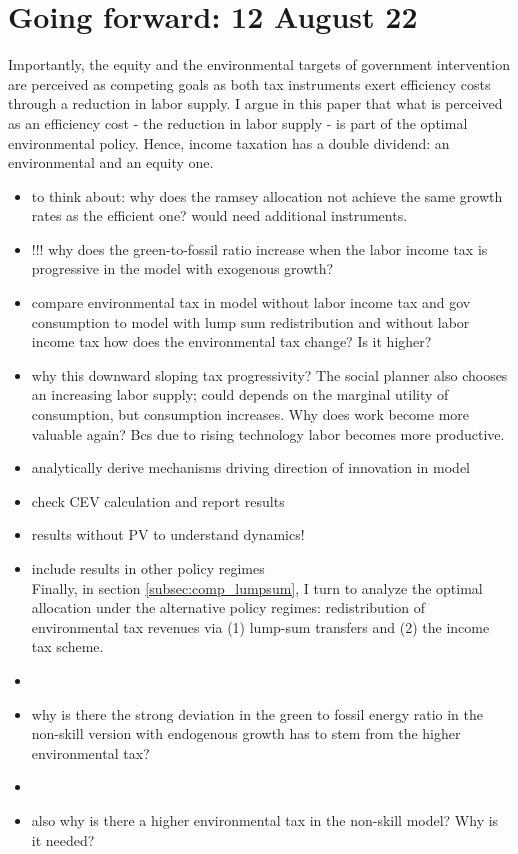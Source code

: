 
\section{Going forward: 12 August 22}

Importantly, the equity and the environmental targets of government intervention are perceived as competing goals as both tax instruments exert efficiency costs through a reduction in labor supply.
I argue in this paper that what is perceived as an efficiency cost -  the reduction in labor supply - is part of the optimal environmental policy. Hence, income taxation has a double dividend: an environmental and an equity one.   




\begin{itemize}
	\item to think about: why does the ramsey allocation not achieve the same growth rates as the efficient one? would need additional instruments.
	\item !!! why does the green-to-fossil ratio increase when the labor income tax is progressive in the model with exogenous growth?
	\item compare environmental tax in model without labor income tax and gov consumption to model with lump sum redistribution and without labor income tax \ar how does the environmental tax change? Is it higher?
	\item why this downward sloping tax progressivity? The social planner also chooses an increasing labor supply; could depends on the marginal utility of consumption, but consumption increases. Why does work become more valuable again? 
	Bcs due to rising technology labor becomes more productive. 
	\item analytically derive mechanisms driving direction of innovation in model
	\item check CEV calculation and report results
	\item results without PV to understand dynamics!
	\item include results in other policy regimes\\
	Finally, in section \ref{subsec:comp_lumpsum}, I turn to analyze the optimal allocation under the alternative policy regimes: redistribution of environmental tax revenues via (1) lump-sum transfers and (2) the income tax scheme. 
	\item {}
	\item why is there the strong deviation in the green to fossil energy ratio in the non-skill version with endogenous growth \ar has to stem from the higher environmental tax? \checkmark 
	\item {}
	\item also why is there a higher environmental tax in the non-skill model? Why is it needed? \checkmark
\end{itemize}
